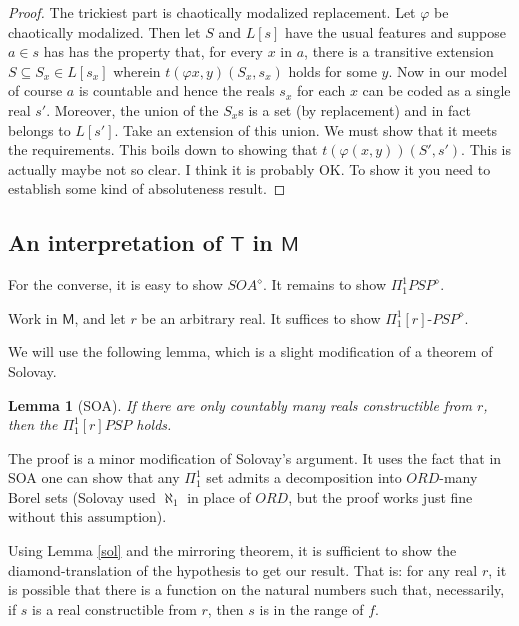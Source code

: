 \documentclass{article}
\newtheorem{Lemma}[Theorem]{Lemma}
\theoremstyle{definition}
\begin{document}
\begin{proof}
    The trickiest part is chaotically modalized replacement. Let $\varphi$ be chaotically modalized. 
    Then let $S$ and $L[s]$ have the usual features and suppose $a \in s$ has has the property that, 
    for every $x$ in $a$, there is a transitive extension $S \subseteq S_x \in L[s_x]$ wherein 
    $t(\varphi x, y)(S_x, s_x)$ holds for some $y$. Now in our model of course $a$ is countable and 
    hence the reals $s_x$ for each $x$ can be coded as a single real $s'$. Moreover, the union of 
    the $S_x$s is a set (by replacement) and in fact belongs to $L[s']$. 
    Take an extension of this union. We must show that it meets the requirements. This boils 
    down to showing that $t(\varphi(x, y))(S', s')$. This is actually maybe not so clear. I think 
    it is probably OK. To show it you need to establish some kind of absoluteness result.
    

\end{proof}


\subsection{An interpretation of $\mathsf{T}$ in $\mathsf{M}$}
For the converse, it is easy to show $SOA^\diamond$. 
It remains to show $\Pi^1_1 PSP^\diamond$. 

Work in $\mathsf{M}$, and let $r$ be an arbitrary real. It suffices to show
$\Pi_1^1[r]$-$PSP^\diamond$. 

We will use the following lemma, which is a slight modification of a theorem of Solovay.
\begin{Lemma}[SOA]\label{sol}
    If there are only countably many reals constructible from $r$, then the $\Pi_1^1[r] PSP$ holds.
\end{Lemma}
The proof is a minor modification of Solovay's argument. It uses the fact that in SOA one can show 
that any $\Pi_1^1$ set admits a decomposition into $ORD$-many Borel sets (Solovay used $\aleph_1$ 
in place of $ORD$, but the proof works just fine without this assumption). 

Using Lemma \eqref{sol} and the mirroring theorem, it is sufficient to show the diamond-translation 
of the hypothesis to get our result. That is: for any real $r$, it is possible that 
there is a function on the natural numbers such that, 
necessarily, if $s$ is a real constructible from $r$, then $s$ is in the range of $f$.
\end{document}
